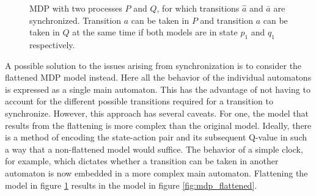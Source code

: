 \begin{figure}
  \centering
  \caption{MDP with two processes $P$ and $Q$, for which transitions $\hat{a}$ and $\bar{a}$ are synchronized. Transition $a$ can be taken in $P$ and transition $a$ can be taken in $Q$ at the same time if both models are in state $p_1$ and $q_1$ respectively.}
  \label{fig:mdp_parallel}
\end{figure}

A possible solution to the issues arising from synchronization is to consider the flattened MDP model instead. Here all the behavior of the individual automatons is expressed as a single main automaton. This has the advantage of not having to account for the different possible transitions required for a transition to synchronize. However, this approach has several caveats. For one, the model that results from the flattening is more complex than the original model. Ideally, there is a method of encoding the state-action pair and its subsequent Q-value in such a way that a non-flattened model would suffice. The behavior of a simple clock, for example, which dictates whether a transition can be taken in another automaton is now embedded in a more complex main automaton. Flattening the model in figure \ref{fig:mdp_parallel} results in the model in figure \ref{fig:mdp_flattened}.

